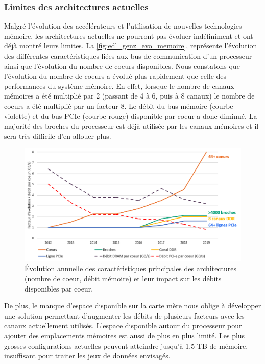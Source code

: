     \subsubsection{Limites des architectures actuelles}
        Malgré l'évolution des accélérateurs et l'utilisation de nouvelles technologies mémoire, les architectures actuelles ne pourront pas évoluer indéfiniment et ont déjà montré leurs limites. La \autoref{fig:edl_genz_evo_memoire}, représente l'évolution des différentes caractéristiques liées aux bus de communication d'un processeur ainsi que l'évolution du nombre de coeurs disponibles. Nous constatons que l'évolution du nombre de coeurs a évolué plus rapidement que celle des performances du système mémoire. En effet, lorsque le nombre de canaux mémoires a été multiplié par 2 (passant de 4 à 6, puis à 8 canaux) le nombre de coeurs a été multiplié par un facteur 8.  Le débit du bus mémoire (courbe violette) et du bus PCIe (courbe rouge) disponible par coeur a donc diminué. La majorité des broches du processeur est déjà utilisée par les canaux mémoires et il sera très difficile d'en allouer plus. 
        
            \begin{figure}
            \center
            \includegraphics[width=14cm]{images/edl_genz_evo_memoire.png}
            \caption{\label{fig:edl_genz_evo_memoire} Évolution annuelle des caractéristiques principales des architectures (nombre de coeur, débit mémoire) et leur impact sur les débits disponibles par coeur.}
            \end{figure}
            
        
        De plus, le manque d'espace disponible sur la carte mère nous oblige à développer une solution permettant d'augmenter les débits de plusieurs facteurs avec les canaux actuellement utilisés. 
        L'espace disponible autour du processeur pour ajouter des emplacements mémoires est aussi de plus en plus limité. Les plus grosses configurations actuelles peuvent atteindre jusqu'à 1.5 TB de mémoire, insuffisant pour traiter les jeux de données envisagés.
    
